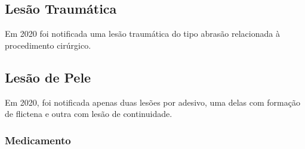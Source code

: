 \documentclass[
  a4paper]{article}
\begin{document}
\subsection{Lesão Traumática}

\hspace{1cm} Em 2020 foi notificada uma lesão traumática do tipo abrasão
relacionada à procedimento cirúrgico.

\subsection{Lesão de Pele}

\hspace{1cm} Em 2020, foi notificada apenas duas lesões por adesivo, uma
delas com formação de flictena e outra com lesão de continuidade.

\subsubsection{Medicamento}

\begin{table}[H]

\caption{\label{tab:unnamed-chunk-12}Classificação das notificações em medicamentos.}
\centering
{}
\end{table}
\end{document}
